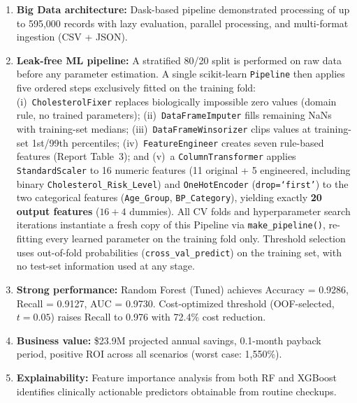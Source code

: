 \documentclass[12pt,a4paper]{article}
\begin{document}
\begin{enumerate}
    \item \textbf{Big Data architecture:} Dask-based pipeline demonstrated processing of up to 595,000 records with lazy evaluation, parallel processing, and multi-format ingestion (CSV + JSON).

    \item \textbf{Leak-free ML pipeline:} A stratified 80/20 split is performed on raw data before any parameter estimation. A single scikit-learn \texttt{Pipeline} then applies five ordered steps exclusively fitted on the training fold: (i)~\texttt{CholesterolFixer} replaces biologically impossible zero values (domain rule, no trained parameters); (ii)~\texttt{DataFrameImputer} fills remaining NaNs with training-set medians; (iii)~\texttt{DataFrameWinsorizer} clips values at training-set 1st/99th percentiles; (iv)~\texttt{FeatureEngineer} creates seven rule-based features (Report Table~3); and (v)~a \texttt{ColumnTransformer} applies \texttt{StandardScaler} to 16 numeric features (11 original + 5 engineered, including binary \texttt{Cholesterol\_Risk\_Level}) and \texttt{OneHotEncoder} (\texttt{drop=`first'}) to the two categorical features (\texttt{Age\_Group}, \texttt{BP\_Category}), yielding exactly \textbf{20 output features} ($16 + 4$ dummies). All CV folds and hyperparameter search iterations instantiate a fresh copy of this Pipeline via \texttt{make\_pipeline()}, re-fitting every learned parameter on the training fold only. Threshold selection uses out-of-fold probabilities (\texttt{cross\_val\_predict}) on the training set, with no test-set information used at any stage.

    \item \textbf{Strong performance:} Random Forest (Tuned) achieves Accuracy = 0.9286, Recall = 0.9127, AUC = 0.9730. Cost-optimized threshold (OOF-selected, $t = 0.05$) raises Recall to 0.976 with 72.4\% cost reduction.

    \item \textbf{Business value:} \$23.9M projected annual savings, 0.1-month payback period, positive ROI across all scenarios (worst case: 1,550\%).

    \item \textbf{Explainability:} Feature importance analysis from both RF and XGBoost identifies clinically actionable predictors obtainable from routine checkups.
\end{enumerate}

\vspace{0.5cm}
\begin{center}
\end{center}
\end{document}
